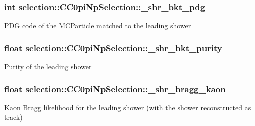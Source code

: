 \subsubsection[{\texorpdfstring{\+\_\+shr\+\_\+bkt\+\_\+pdg}{_shr_bkt_pdg}}]{\setlength{\rightskip}{0pt plus 5cm}int selection\+::\+C\+C0pi\+Np\+Selection\+::\+\_\+shr\+\_\+bkt\+\_\+pdg\hspace{0.3cm}{\ttfamily [private]}}\hypertarget{classselection_1_1CC0piNpSelection_aab09f93d7cd57031de714956414f3230}{}\label{classselection_1_1CC0piNpSelection_aab09f93d7cd57031de714956414f3230}
P\+DG code of the M\+C\+Particle matched to the leading shower 
\subsubsection[{\texorpdfstring{\+\_\+shr\+\_\+bkt\+\_\+purity}{_shr_bkt_purity}}]{\setlength{\rightskip}{0pt plus 5cm}float selection\+::\+C\+C0pi\+Np\+Selection\+::\+\_\+shr\+\_\+bkt\+\_\+purity\hspace{0.3cm}{\ttfamily [private]}}\hypertarget{classselection_1_1CC0piNpSelection_a1da68886d5b7a5b4eb1785649c48e8ef}{}\label{classselection_1_1CC0piNpSelection_a1da68886d5b7a5b4eb1785649c48e8ef}
Purity of the leading shower 
\subsubsection[{\texorpdfstring{\+\_\+shr\+\_\+bragg\+\_\+kaon}{_shr_bragg_kaon}}]{\setlength{\rightskip}{0pt plus 5cm}float selection\+::\+C\+C0pi\+Np\+Selection\+::\+\_\+shr\+\_\+bragg\+\_\+kaon\hspace{0.3cm}{\ttfamily [private]}}\hypertarget{classselection_1_1CC0piNpSelection_a0fae2cdec5a695421cbe2fdfe6e61c9d}{}\label{classselection_1_1CC0piNpSelection_a0fae2cdec5a695421cbe2fdfe6e61c9d}
Kaon Bragg likelihood for the leading shower (with the shower reconstructed as track) 
